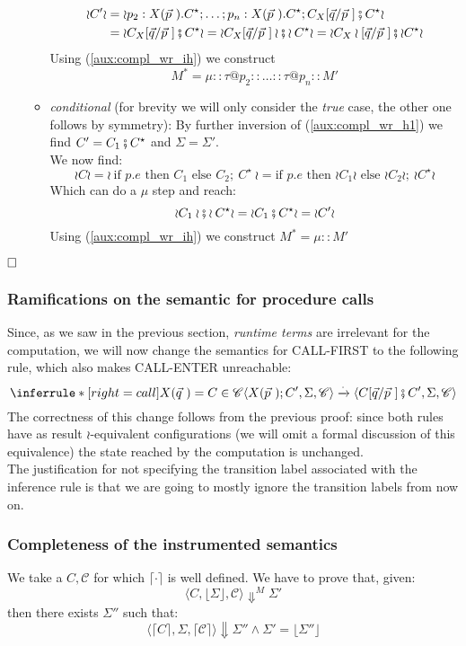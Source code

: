 \documentclass[12pt,a4paper,twoside]{book}
\newcommand{\qed}{\hfill\square}
\begin{document}
\begin{itemize}
\begin{itemize}
				\begin{align*}
					\wr C' \wr &= \wr p_2 : X(\vec{p}~).C^\star; \ldots; p_n : X(\vec{p}~).C^\star; C_X[\vec{q}/\vec{p}~] \fatsemi C^\star \wr \\
					&= \wr C_X[\vec{q}/\vec{p}~] \fatsemi C^\star \wr =
		\wr C_X[\vec{q}/\vec{p}~] \wr \fatsemi \wr C^\star \wr =
				\wr C_X\wr[\vec{q}/\vec{p}~] \fatsemi \wr C^\star \wr
				\end{align*}
				Using (\ref{aux:compl_wr_ih}) we construct
				$$ M^* = \mu :: \tau@p_2 :: \ldots :: \tau@p_n :: M'$$
			\item \emph{conditional} (for brevity we will only consider the \emph{true} case, the other one follows by symmetry):
				By further inversion of (\ref{aux:compl_wr_h1}) we find $C' = C_1 \fatsemi C^\star$ and $\Sigma = \Sigma'$.\\
				We now find:
				$$
				\wr C \wr = \wr~\text{if } p.e \text{ then } C_1 \text{ else } C_2;~C^\star~\wr 
				= \text{if } p.e \text{ then } \wr C_1 \wr \text{ else } \wr C_2\wr;~\wr C^\star \wr 
				$$
				Which can do a $\mu$ step and reach:
				$$ \wr C_1 \wr \fatsemi \wr C^\star \wr = \wr C_1 \fatsemi C^\star \wr = \wr C' \wr$$
				Using (\ref{aux:compl_wr_ih}) we construct $M^* = \mu :: M'$
		\end{itemize}
\end{itemize}
$\qed$

\subsubsection{Ramifications on the semantic for procedure calls}
Since, as we saw in the previous section, \emph{runtime terms} are irrelevant for the computation, we will now change the semantics for CALL-FIRST to the following rule, which also makes CALL-ENTER unreachable:
$$
    \inferrule*[right=call] { X(\vec{q}~) = C \in \mathscr{C}}
	{\langle X(\vec{p}~);C', \Sigma, \mathscr{C} \rangle \xrightarrow{\cdot} \langle C[\vec{q}/\vec{p}~] \fatsemi C', \Sigma, \mathscr{C} \rangle}
$$
The correctness of this change follows from the previous proof: since both rules have as result $\wr$-equivalent configurations (we will omit a formal discussion of this equivalence) the state reached by the computation is unchanged.\\
The justification for not specifying the transition label associated with the inference rule is that we are going to mostly ignore the transition labels from now on.

\subsubsection{Completeness of the instrumented semantics}
We take a  $C, \mathscr{C}$ for which $\lceil \cdot \rceil$ is well defined.
We have to prove that, given:
$$
\langle C, \lfloor \Sigma \rfloor, \mathscr{C}\rangle \Downarrow^M \Sigma'
$$
then there exists $\Sigma''$ such that:
$$
\langle \lceil C \rceil, \Sigma, \lceil \mathscr{C}\rceil\rangle \Downarrow \Sigma''
\land \Sigma' = \lfloor \Sigma'' \rfloor 
$$
\end{document}
